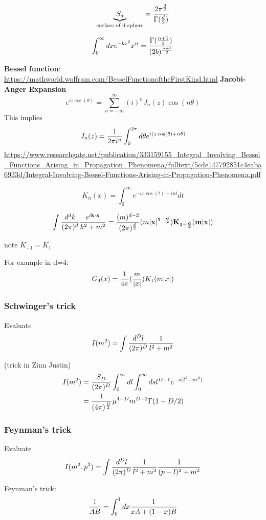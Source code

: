 \documentclass[11pt]{scrartcl}
\begin{document}
\[	\underbrace{S_d}_{\text{surface of d-sphere}}  = {2 \pi^{d \over 2} \over \Gamma({d \over 2})}  \]

\[	\int_0^\infty dx e^{-b x^2} x^n  = { \Gamma ({n+1 \over 2}) \over (2 b)^{n+1 \over 2}} \]


\textbf{Bessel function}:
\url{https://mathworld.wolfram.com/BesselFunctionoftheFirstKind.html}
\textbf{Jacobi-Anger Expansion}
\[ e^{iz \cos(\theta)} = \sum_{n = -\infty}^\infty (i)^n J_n(z) \cos(n \theta) \]
This implies
\[J_n(z) = {1 \over 2 \pi i^n} \int_{0}^{2 \pi} d \theta e^{i(z \cos(\theta) + n \theta)}\]
\url{https://www.researchgate.net/publication/333159155_Integral_Involving_Bessel_Functions_Arising_in_Propagation_Phenomena/fulltext/5cde147792851c4eaba6923d/Integral-Involving-Bessel-Functions-Arising-in-Propagation-Phenomena.pdf}

\[K_n(x) = \int_{0}^\infty e^{-ix \cos(t) -int} dt\]

\[\int {d^d k \over (2 \pi)^d } {e^{i \bf{k} \cdot \bf{x}} \over k^2 + m^2} = {(m)^{d - 2} \over (2 \pi)^{d \over 2}} (m | \bf{x} |^{1 - {d \over 2}}) K_{1- {d \over 2}} (m |\bf{x}|) \]

note $K_{-1} = K_1$

For example in d=4:
\[G_4(x) = {1 \over 4 \pi } ({m \over |x|}) K_1(m|x|)\]
\subsubsection{Schwinger's trick}
\begin{problem}
	Evaluate $$I(m^2) = \int {d^D l \over (2 \pi)^D} {1 \over l^2 + m^2}$$
\end{problem}
(trick in Zinn Justin)
\begin{align}
	I(m^2) & = {S_D \over (2 \pi)^D} \int_0^\infty dl \int_{0}^\infty ds  l^{D-1}  e^{- s(l^2 + m^2)} \\
	& = {1 \over (4 \pi)^{D \over 2}} \mu^{4-D} m^{D-2}  \Gamma(1 - D/2)
\end{align}

\subsubsection{Feynman's trick}
\begin{problem}
	Evaluate $$I(m^2, p^2) = \int {d^D l \over (2 \pi)^D} {1 \over l^2 + m^2} {1 \over (p-l)^2 + m^2}$$
\end{problem}

\begin{lemma}
	Feynman's trick:
	$${1 \over AB} = \int_0^1 dx {1 \over x A + (1-x) B}$$
\end{lemma}
\end{document}
